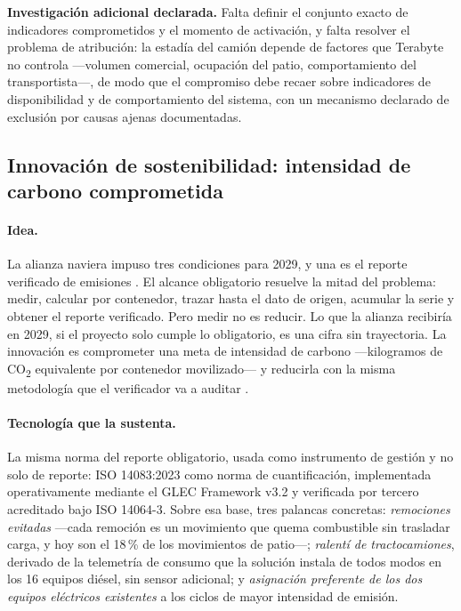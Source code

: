 \begin{bloqueDuda}
\textbf{Investigación adicional declarada.} Falta definir el conjunto exacto de
indicadores comprometidos y el momento de activación, y falta resolver el
problema de atribución: la estadía del camión depende de factores que Terabyte
no controla —volumen comercial, ocupación del patio, comportamiento del
transportista—, de modo que el compromiso debe recaer sobre indicadores de
disponibilidad y de comportamiento del sistema, con un mecanismo declarado de
exclusión por causas ajenas documentadas.
\end{bloqueDuda}

\subsection{Innovación de sostenibilidad: intensidad de carbono comprometida}

\paragraph*{Idea.}
La alianza naviera impuso tres condiciones para 2029, y una es el reporte
verificado de emisiones \Hecho. El alcance obligatorio resuelve la mitad del
problema: medir, calcular por contenedor, trazar hasta el dato de origen,
acumular la serie y obtener el reporte verificado. Pero medir no es reducir. Lo
que la alianza recibiría en 2029, si el proyecto solo cumple lo obligatorio, es
una cifra sin trayectoria. La innovación es comprometer una meta de intensidad
de carbono —kilogramos de CO\textsubscript{2} equivalente por contenedor
movilizado— y reducirla con la misma metodología que el verificador va a
auditar \Propuesta.

\paragraph*{Tecnología que la sustenta.}
La misma norma del reporte obligatorio, usada como instrumento de gestión y no
solo de reporte: ISO 14083:2023 como norma de cuantificación, implementada
operativamente mediante el GLEC Framework v3.2 y verificada por tercero
acreditado bajo ISO 14064-3. Sobre esa base, tres palancas concretas:
\emph{remociones evitadas} —cada remoción es un movimiento que quema
combustible sin trasladar carga, y hoy son el 18\,\% de los movimientos de
patio—; \emph{ralentí de tractocamiones}, derivado de la telemetría de consumo
que la solución instala de todos modos en los 16 equipos diésel, sin sensor
adicional; y \emph{asignación preferente de los dos equipos eléctricos
existentes} a los ciclos de mayor intensidad de emisión.

